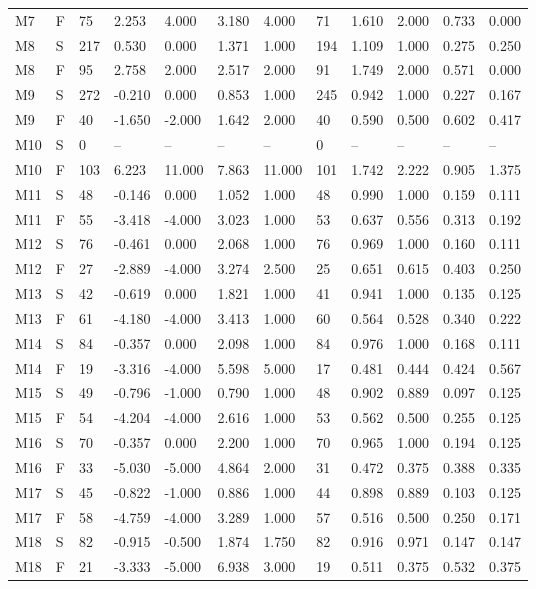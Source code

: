 {\begin{longtable}{llllllllllll}
M7 & F & 75 & 2.253 & 4.000 & 3.180 & 4.000 & 71 & 1.610 & 2.000 & 0.733 & 0.000 \\
M8 & S & 217 & 0.530 & 0.000 & 1.371 & 1.000 & 194 & 1.109 & 1.000 & 0.275 & 0.250 \\
M8 & F & 95 & 2.758 & 2.000 & 2.517 & 2.000 & 91 & 1.749 & 2.000 & 0.571 & 0.000 \\
M9 & S & 272 & -0.210 & 0.000 & 0.853 & 1.000 & 245 & 0.942 & 1.000 & 0.227 & 0.167 \\
M9 & F & 40 & -1.650 & -2.000 & 1.642 & 2.000 & 40 & 0.590 & 0.500 & 0.602 & 0.417 \\
M10 & S & 0 & -- & -- & -- & -- & 0 & -- & -- & -- & -- \\
M10 & F & 103 & 6.223 & 11.000 & 7.863 & 11.000 & 101 & 1.742 & 2.222 & 0.905 & 1.375 \\
M11 & S & 48 & -0.146 & 0.000 & 1.052 & 1.000 & 48 & 0.990 & 1.000 & 0.159 & 0.111 \\
M11 & F & 55 & -3.418 & -4.000 & 3.023 & 1.000 & 53 & 0.637 & 0.556 & 0.313 & 0.192 \\
M12 & S & 76 & -0.461 & 0.000 & 2.068 & 1.000 & 76 & 0.969 & 1.000 & 0.160 & 0.111 \\
M12 & F & 27 & -2.889 & -4.000 & 3.274 & 2.500 & 25 & 0.651 & 0.615 & 0.403 & 0.250 \\
M13 & S & 42 & -0.619 & 0.000 & 1.821 & 1.000 & 41 & 0.941 & 1.000 & 0.135 & 0.125 \\
M13 & F & 61 & -4.180 & -4.000 & 3.413 & 1.000 & 60 & 0.564 & 0.528 & 0.340 & 0.222 \\
M14 & S & 84 & -0.357 & 0.000 & 2.098 & 1.000 & 84 & 0.976 & 1.000 & 0.168 & 0.111 \\
M14 & F & 19 & -3.316 & -4.000 & 5.598 & 5.000 & 17 & 0.481 & 0.444 & 0.424 & 0.567 \\
M15 & S & 49 & -0.796 & -1.000 & 0.790 & 1.000 & 48 & 0.902 & 0.889 & 0.097 & 0.125 \\
M15 & F & 54 & -4.204 & -4.000 & 2.616 & 1.000 & 53 & 0.562 & 0.500 & 0.255 & 0.125 \\
M16 & S & 70 & -0.357 & 0.000 & 2.200 & 1.000 & 70 & 0.965 & 1.000 & 0.194 & 0.125 \\
M16 & F & 33 & -5.030 & -5.000 & 4.864 & 2.000 & 31 & 0.472 & 0.375 & 0.388 & 0.335 \\
M17 & S & 45 & -0.822 & -1.000 & 0.886 & 1.000 & 44 & 0.898 & 0.889 & 0.103 & 0.125 \\
M17 & F & 58 & -4.759 & -4.000 & 3.289 & 1.000 & 57 & 0.516 & 0.500 & 0.250 & 0.171 \\
M18 & S & 82 & -0.915 & -0.500 & 1.874 & 1.750 & 82 & 0.916 & 0.971 & 0.147 & 0.147 \\
M18 & F & 21 & -3.333 & -5.000 & 6.938 & 3.000 & 19 & 0.511 & 0.375 & 0.532 & 0.375 \\
\end{longtable}}

